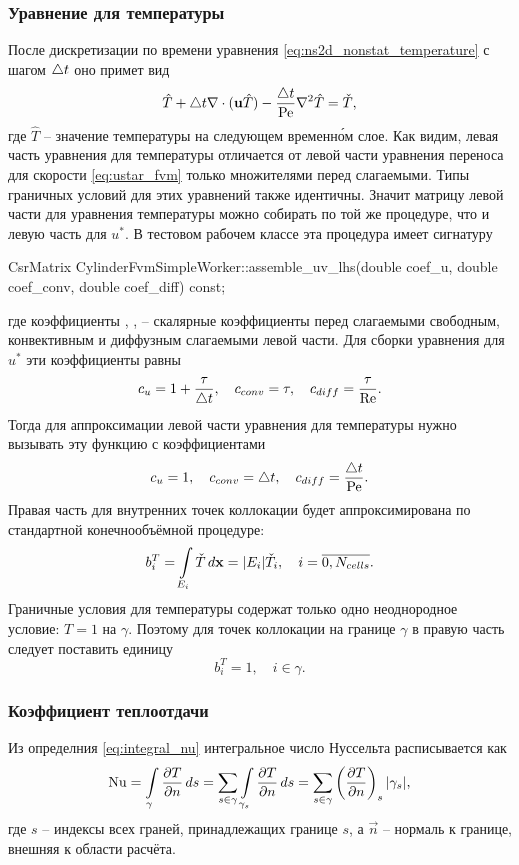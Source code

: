 \subsubsection{Уравнение для температуры}
После дискретизации по времени уравнения \cref{eq:ns2d_nonstat_temperature} с шагом $\dt$ оно примет вид
\begin{equation}
\label{eq:temperature_fvm}
\hat T + \dt \nabla\cdot(\vec u \hat T) - \frac{\dt}{\Pen}\nabla^2 \hat T = \check T,
\end{equation}
где $\hat T$ -- значение температуры на следующем временн\'{о}м слое.
Как видим, левая часть уравнения для температуры отличается от
левой части уравнения переноса для скорости \cref{eq:ustar_fvm} только множителями перед слагаемыми.
Типы граничных условий для этих уравнений также идентичны.
Значит матрицу левой части для уравнения температуры можно собирать по той же процедуре, что
и левую часть для $u^*$.
В тестовом рабочем классе эта процедура имеет сигнатуру
\begin{cppcode}
CsrMatrix CylinderFvmSimpleWorker::assemble_uv_lhs(double coef_u, double coef_conv, double coef_diff) const;
\end{cppcode}
где коэффициенты , ,  -- скалярные коэффициенты
перед слагаемыми свободным, конвективным и диффузным слагаемыми левой части.
Для сборки уравнения для $u^*$ эти коэффициенты равны 
$$
c_u = 1 + \frac{\tau}{\dt}, \quad c_{conv} = \tau, \quad c_{diff} = \frac{\tau}{\Ren}.
$$
Тогда для аппроксимации левой части уравнения для температуры нужно вызывать эту функцию
с коэффициентами
$$
c_u = 1, \quad c_{conv} = \dt, \quad c_{diff} = \frac{\dt}{\Pen}.
$$
Правая часть для внутренних точек коллокации будет аппроксимирована по стандартной конечнообъёмной процедуре:
\begin{equation*}
b^T_i = \arint{\check T}{E_i}{\vec x} = |E_i| \check T_i, \quad i = \overline{0, N_{cells}}.
\end{equation*}
Граничные условия для температуры содержат только одно неоднородное условие: $T=1$ на $\gamma$.
Поэтому для точек коллокации на границе $\gamma$ в правую часть следует поставить единицу
\begin{equation*}
b^T_i = 1, \quad i\in\gamma.
\end{equation*}

\subsubsection{Коэффициент теплоотдачи}
Из определния \cref{eq:integral_nu} интегральное число Нуссельта
расписывается как
\begin{equation}
\label{eq:fvm_nu}
\Nun = \arint{\dfr{T}{n}}{\gamma}{s}
= \sum_{s\in\gamma} \arint{\dfr{T}{n}}{\gamma_s}{s}
= \sum_{s\in\gamma}\left(\dfr{T}{n}\right)_{s} |\gamma_s|,
\end{equation}
где $s$ -- индексы всех граней, принадлежащих границе $s$,
а $\vec n$ -- нормаль к границе, внешняя к области расчёта.

